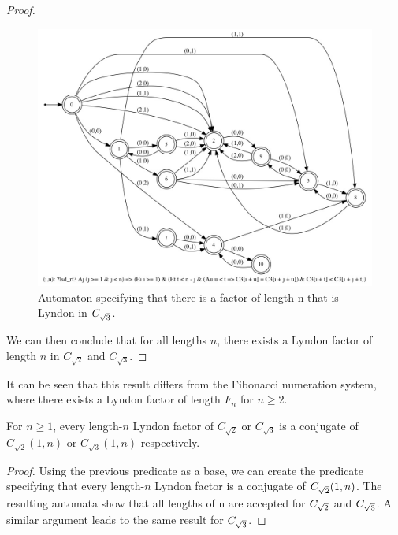 \begin{proof}
\begin{figure}[h!]
\begin{minipage}{0.45\textwidth}
  	\end{minipage}%
    \hspace{0.05\textwidth}
    \begin{minipage}{0.45\textwidth}
      \centering
      \includegraphics[width=\linewidth]{sturmian_word_paper/paper_images/root3theorem25.jpg}
      \caption{Automaton specifying that there is a factor of length n that is Lyndon in $C_{\sqrt{3}}$.}
      \centering

    \end{minipage}
\end{figure}

We can then conclude that for all lengths $n$, there exists a Lyndon factor of length $n$ in $C_{\sqrt{2}}$ and $C_{\sqrt{3}}$.
\end{proof}

It can be seen that this result differs from the Fibonacci numeration system, where there exists a Lyndon factor of length $F_n$ for $n \geq 2$.

\begin{theorem}
For $n \geq 1$, every length-$n$ Lyndon factor of $C_{\sqrt{2}}$ or $C_{\sqrt{3}}$ is a conjugate of $C_{\sqrt{2}}(1, n)$ or $C_{\sqrt{3}}(1, n)$ respectively.
\end{theorem}

\begin{proof}
Using the previous predicate as a base, we can create the predicate specifying that every length-$n$ Lyndon factor is a conjugate of $C_{\sqrt{2}}(1, n)$. The resulting automata show that all lengths of n are accepted for $C_{\sqrt{2}}$ and $C_{\sqrt{3}}$. A similar argument leads to the same result for $C_{\sqrt{3}}$.
\end{proof}

